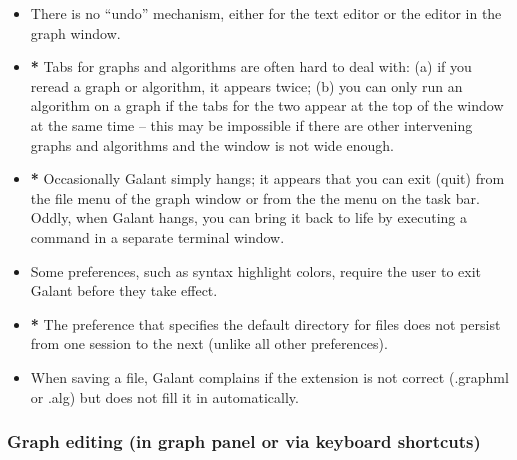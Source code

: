 \begin{itemize}

\item There is no ``undo'' mechanism, either for the text editor or the
  editor in the graph window.

\item \textbf{*} Tabs for graphs and algorithms are often hard to deal with: (a) if you
  reread a graph or algorithm, it appears twice; (b) you can only run an
  algorithm on a graph if the tabs for the two appear at the top of the
  window at the same time -- this
  may be impossible if there are other intervening graphs and algorithms
  and the window is not wide enough.

\item \textbf{*} Occasionally Galant simply hangs;
  it appears that you can exit (quit) from
  the file menu of the graph window or from the the  menu on the
  task bar.
  Oddly, when Galant hangs, you can bring it back to life by executing a
  command in a separate terminal window.

\item
  Some preferences, such as syntax highlight colors, require the user to exit
  Galant before they take effect.

\item \textbf{*}
  The  preference that specifies the default directory for
  files does not persist from one session to the next (unlike all other preferences).

\item
  When saving a file, Galant complains if the extension is not correct
  (\textsf{.graphml} or \textsf{.alg}) but does not fill it in automatically.

\end{itemize}

\subsubsection*{Graph editing (in graph panel or via keyboard shortcuts)}

